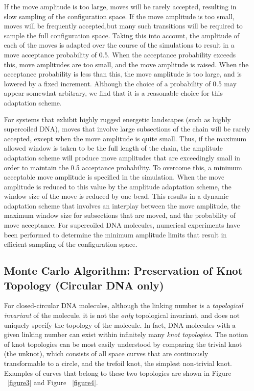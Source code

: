 \documentclass[english]{article}
\begin{document}
If the move amplitude is too large, moves will be rarely accepted, resulting in slow sampling of the configuration space. If the move amplitude is too small, moves will be frequently accepted,but many such transitions will be required to sample the full configuration space. Taking this into account, the amplitude of each of the moves is adapted over the course of the simulations to result in a move acceptance probability of 0.5. When the acceptance probability exceeds this, move amplitudes are too small, and the move amplitude is raised. When the acceptance probability is less than this, the move amplitude is too large, and is lowered by a fixed increment. Although the choice of a probability of 0.5 may appear somewhat arbitrary, we find that it is a reasonable choice for this adaptation scheme.

For systems that exhibit highly rugged energetic landscapes (such as highly supercoiled DNA), moves that involve large subsections of the chain will be rarely accepted, except when the move amplitude is quite small. Thus, if the maximum allowed window is taken to be the full length of the chain, the amplitude adaptation scheme will produce move amplitudes that are exceedingly small in order to maintain the 0.5 acceptance probability. To overcome this, a minimum acceptable move amplitude is specified in the simulation. When the move amplitude is reduced to this value by the amplitude adaptation scheme, the window size of the move is reduced by one bead. This results in a dynamic adaptation scheme that involves an interplay between the move amplitude, the maximum window size for subsections that are moved, and the probability of move acceptance. For supercoiled DNA molecules, numerical experiments have been performed to determine the minimum amplitude limits that result in efficient sampling of the configuration space. 

\subsection{Monte Carlo Algorithm: Preservation of Knot Topology (Circular DNA only)}

For closed-circular DNA molecules, although the linking number is a \emph{topological invariant} of the molecule, it is not the \emph{only} topological invariant, and does not uniquely specify the topology of the molecule. In fact, DNA molecules with a given linking number can exist within infinitely many \emph{knot topologies}. The notion of knot topologies can be most easily understood by comparing the trivial knot (the unknot), which consists of all space curves that are continously transformable to a circle, and the trefoil knot, the simplest non-trivial knot. Examples of curves that belong to these two topologies are shown in Figure ~\ref{figure3} and Figure ~\ref{figure4}.
\end{document}
